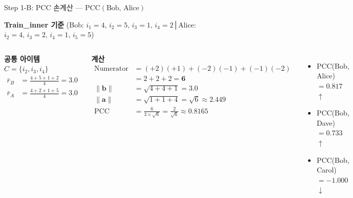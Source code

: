 \documentclass[aspectratio=169, 10pt]{beamer}
\begin{document}
\begin{frame}[shrink=8]{Step 1-B: PCC 손계산 — $\text{PCC}(\text{Bob},\,\text{Alice})$}

  \textbf{Train\_inner 기준} (Bob: $i_1{=}4,\,i_2{=}5,\,i_3{=}1,\,i_4{=}2$\;\;│\;\;Alice: $i_2{=}4,\,i_3{=}2,\,i_4{=}1,\,i_5{=}5$)

  \vspace{0.4em}
  \begin{columns}[T]
      \textbf{공통 아이템} $C = \{i_2, i_3, i_4\}$
      \begin{align*}
        \bar{r}_B &= \tfrac{4{+}5{+}1{+}2}{4} = 3.0 \\
        \bar{r}_A &= \tfrac{4{+}2{+}1{+}5}{4} = 3.0
      \end{align*}

      \vspace{0.1em}
      \renewcommand{\arraystretch}{1}

      \textbf{계산}
      \begin{align*}
        \text{Numerator}   &= (+2)(+1)+(-2)(-1)+(-1)(-2) \\
                           &= 2 + 2 + 2 = \mathbf{6} \\[6pt]
        \|\mathbf{b}\|     &= \sqrt{4+4+1} = 3{.}0 \\
        \|\mathbf{a}\|     &= \sqrt{1+1+4} = \sqrt{6} \approx 2{.}449 \\[6pt]
        \text{PCC}         &= \frac{6}{3 \times \sqrt{6}}
                            = \frac{2}{\sqrt{6}}
                           \approx \mathbf{0.8165}
      \end{align*}
  
  \vspace{0.1cm}
  \begin{itemize}
        \item PCC(Bob, Alice) $= 0.817$ \textcolor{posblue}{$\uparrow$}
        \item PCC(Bob, Dave)  $= 0.733$ \textcolor{posblue}{$\uparrow$}
        \item PCC(Bob, Carol) $= -1.000$ \textcolor{negred}{$\downarrow$}
      \end{itemize}
    \end{columns}
\end{frame}
\end{document}
